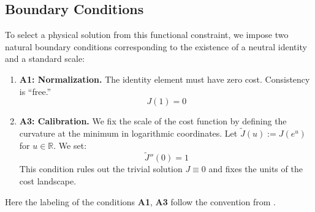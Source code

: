 \documentclass[11pt,a4paper]{article}
\begin{document}
\subsection{Boundary Conditions}
To select a physical solution from this functional constraint, we impose two natural boundary conditions corresponding to the existence of a neutral identity and a standard scale:

\begin{enumerate}
    \item \textbf{A1: Normalization.} The identity element must have zero cost. Consistency is ``free.'' 
    \begin{equation}
        J(1) = 0
    \end{equation}

    \item \textbf{A3: Calibration.} We fix the scale of the cost function by defining the curvature at the minimum in logarithmic coordinates. Let $\widetilde{J}(u):=J(e^{u})$ for $u\in\mathbb{R}$. We set:
    \begin{equation}
      \widetilde{J}''(0) = 1
    \end{equation}
    This condition rules out the trivial solution $J\equiv 0$ and fixes the units of the cost landscape.
\end{enumerate}
Here the labeling of the conditions \textbf{A1}, \textbf{A3} follow the convention from  \cite{CoherentComparisonLedger}. 
\end{document}
